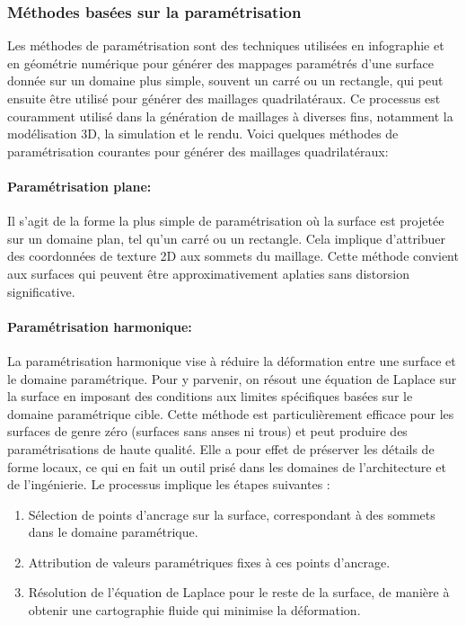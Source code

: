 \subsubsection{Méthodes basées sur la paramétrisation}

Les méthodes de paramétrisation sont des techniques utilisées en infographie et en géométrie numérique pour générer des mappages paramétrés d'une surface donnée sur un domaine plus simple, souvent un carré ou un rectangle, qui peut ensuite être utilisé pour générer des maillages quadrilatéraux. Ce processus est couramment utilisé dans la génération de maillages à diverses fins, notamment la modélisation 3D, la simulation et le rendu. Voici quelques méthodes de paramétrisation courantes pour générer des maillages quadrilatéraux:

\paragraph{Paramétrisation plane:} Il s'agit de la forme la plus simple de paramétrisation où la surface est projetée sur un domaine plan, tel qu'un carré ou un rectangle. Cela implique d'attribuer des coordonnées de texture 2D aux sommets du maillage. Cette méthode convient aux surfaces qui peuvent être approximativement aplaties sans distorsion significative.

\paragraph{Paramétrisation harmonique:} La paramétrisation harmonique vise à réduire la déformation entre une surface et le domaine paramétrique. Pour y parvenir, on résout une équation de Laplace sur la surface en imposant des conditions aux limites spécifiques basées sur le domaine paramétrique cible. Cette méthode est particulièrement efficace pour les surfaces de genre zéro (surfaces sans anses ni trous) et peut produire des paramétrisations de haute qualité. Elle a pour effet de préserver les détails de forme locaux, ce qui en fait un outil prisé dans les domaines de l'architecture et de l'ingénierie. Le processus implique les étapes suivantes :\\

\begin{enumerate}
    \item Sélection de points d'ancrage sur la surface, correspondant à des sommets dans le domaine paramétrique.\\
    \item Attribution de valeurs paramétriques fixes à ces points d'ancrage.\\
    \item Résolution de l'équation de Laplace pour le reste de la surface, de manière à obtenir une cartographie fluide qui minimise la déformation.
\end{enumerate}



